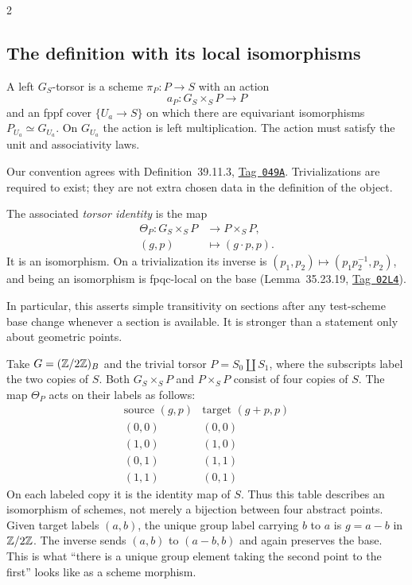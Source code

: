 \documentclass[12pt]{memoir}
\newcommand{\BGtag}[1]{\href{https://stacks.math.columbia.edu/tag/#1}{Tag~\texttt{#1}}}
\begin{document}
\begin{multicols}{2}
\subsection{The definition with its local isomorphisms}
\begin{Def}\label{def:torsor}
A left $G_S$-torsor is a scheme $\pi_P:P\to S$ with an action
\[
 a_P:G_S\times_S P\longrightarrow P
\]
and an fppf cover $\{U_a\to S\}$ on which there are equivariant
isomorphisms $P_{U_a}\simeq G_{U_a}$. On $G_{U_a}$ the action is left
multiplication. The action must satisfy the unit and associativity laws.
\end{Def}
Our convention agrees with Definition~39.11.3, \BGtag{049A}.
Trivializations are required to exist; they are not extra chosen data in
the definition of the object.

The associated \emph{torsor identity} is the map
\begin{equation}\label{eq:theta}
\begin{aligned}
 \Theta_P:G_S\times_S P&\longrightarrow P\times_S P,\\
 (g,p)&\longmapsto(g\cdot p,p).
\end{aligned}
\end{equation}
It is an isomorphism. On a trivialization its inverse is
$(p_1,p_2)\mapsto(p_1p_2^{-1},p_2)$, and being an isomorphism is
fpqc-local on the base (Lemma~35.23.19, \BGtag{02L4}).

In particular, this asserts simple transitivity on sections after any
test-scheme base change whenever a section is available. It is stronger
than a statement only about geometric points.

\begin{Ex}
Take $G=(\mathbb{Z}/2\mathbb{Z})_B$ and the trivial torsor $P=S_0\amalg S_1$,
where the subscripts label the two copies of $S$. Both
$G_S\times_S P$ and $P\times_S P$ consist of four copies of $S$.
The map $\Theta_P$ acts on their labels as follows:
\[
\begin{array}{c|c}
 \text{source }(g,p)&\text{target }(g+p,p)\\ \hline
 (0,0)&(0,0)\\
 (1,0)&(1,0)\\
 (0,1)&(1,1)\\
 (1,1)&(0,1)
\end{array}
\]
On each labeled copy it is the identity map of $S$. Thus this table
describes an isomorphism of schemes, not merely a bijection between
four abstract points. Given target labels $(a,b)$, the unique group
label carrying $b$ to $a$ is $g=a-b$ in $\mathbb{Z}/2\mathbb{Z}$. The inverse
sends $(a,b)$ to $(a-b,b)$ and again preserves the base. This is what
``there is a unique group element taking the second point to the
first'' looks like as a scheme morphism.
\end{Ex}


\end{multicols}
\end{document}
